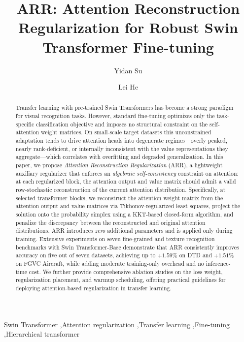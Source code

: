 \documentclass[review,12pt,authoryear]{elsarticle}
\newcommand{\method}{ARR}
\begin{document}
\linenumbers

\begin{frontmatter}

\title{\method{}: Attention Reconstruction Regularization for Robust Swin Transformer Fine-tuning}

\author[addr1,addr2,addr3]{Yidan Su}
\author[addr1,addr2]{Lei He}

\address[addr1]{School of Vehicle and Mobility, Tsinghua University, Beijing, China}
\address[addr2]{State Key Laboratory of Intelligent Green Vehicle and Mobility, Tsinghua University, Beijing, China}
\address[addr3]{School of Mathematical Sciences, Beijing University of Posts and Telecommunications, Beijing, China}

\begin{abstract}
Transfer learning with pre-trained Swin Transformers has become a strong paradigm for visual recognition tasks.
However, standard fine-tuning optimizes only the task-specific classification objective and imposes no structural constraint on the self-attention weight matrices.
On small-scale target datasets this unconstrained adaptation tends to drive attention heads into degenerate regimes---overly peaked, nearly rank-deficient, or internally inconsistent with the value representations they aggregate---which correlates with overfitting and degraded generalization.
In this paper, we propose \emph{Attention Reconstruction Regularization} (\method{}), a lightweight auxiliary regularizer that enforces an \emph{algebraic self-consistency} constraint on attention: at each regularized block, the attention output and value matrix should admit a valid row-stochastic reconstruction of the current attention distribution.
Specifically, at selected transformer blocks, we reconstruct the attention weight matrix from the attention output and value matrices via Tikhonov-regularized least squares, project the solution onto the probability simplex using a KKT-based closed-form algorithm, and penalize the discrepancy between the reconstructed and original attention distributions.
\method{} introduces \emph{zero} additional parameters and is applied only during training.
Extensive experiments on seven fine-grained and texture recognition benchmarks with Swin Transformer-Base demonstrate that \method{} consistently improves accuracy on five out of seven datasets, achieving up to $+1.59\%$ on DTD and $+1.51\%$ on FGVC Aircraft, while adding moderate training-only overhead and no inference-time cost.
We further provide comprehensive ablation studies on the loss weight, regularization placement, and warmup scheduling, offering practical guidelines for deploying attention-based regularization in transfer learning.
\end{abstract}

\begin{keyword}
Swin Transformer \sep Attention regularization \sep Transfer learning \sep Fine-tuning \sep Hierarchical transformer
\end{keyword}

\end{frontmatter}
\end{document}

